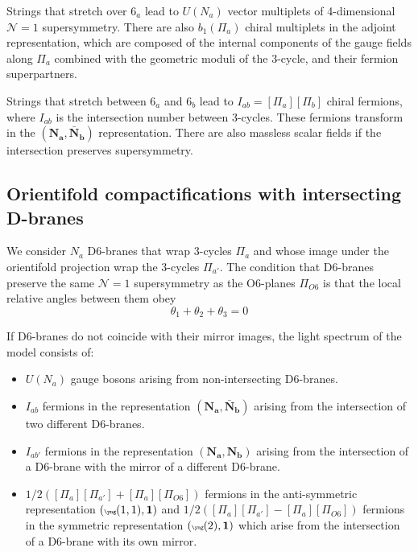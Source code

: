 Strings that stretch over $6_a$ lead to $U(N_a)$ vector multiplets of 4-dimensional $\mathcal N=1$ supersymmetry.
There are also $b_1(\Pi_a)$ chiral multiplets in the adjoint representation,
which are composed of the internal components of the gauge fields along $\Pi_a$ combined with 
the geometric moduli of the $3$-cycle, and their fermion superpartners.

Strings that stretch between $6_a$ and $6_b$ lead to $I_{ab}=[\Pi_a][\Pi_b]$ chiral fermions, where $I_{ab}$ 
is the intersection number between $3$-cycles. These fermions transform in the $(\mathbf{N_a},\mathbf{\bar N_b})$ representation.
There are also massless scalar fields if the intersection preserves supersymmetry.

\subsection{Orientifold compactifications with intersecting D-branes}

We consider $N_a$ D$6$-branes that wrap 3-cycles $\Pi_a$ and whose image under the orientifold
projection wrap the 3-cycles $\Pi_{a'}$.
The condition that D$6$-branes preserve the same $\mathcal N=1$ supersymmetry as the O$6$-planes $\Pi_{O6}$
is that the local relative angles between them obey
\begin{equation}
  \theta_1 + \theta_2 + \theta_3 = 0
\end{equation}

If D$6$-branes do not coincide with their mirror images, the light spectrum of the model consists of:
\begin{itemize}
  \item $U(N_a)$ gauge bosons arising from non-intersecting D$6$-branes.
  \item $I_{ab}$ fermions in the representation $(\mathbf{N_a},\mathbf{\bar N_b})$ arising from the
    intersection of two different D$6$-branes.
  \item $I_{ab'}$ fermions in the representation $(\mathbf{N_a},\mathbf{N_b})$ arising from the intersection of 
    a D$6$-brane with the mirror of a different D$6$-brane.
  \item $1/2([\Pi_a][\Pi_{a'}]+[\Pi_a][\Pi_{O6}])$ fermions in the anti-symmetric representation $({\tiny\yng(1,1)},\mathbf 1)$ and
    $1/2([\Pi_a][\Pi_{a'}]-[\Pi_a][\Pi_{O6}])$ fermions in the symmetric representation $({\tiny\yng(2)},\mathbf 1)$ which
    arise from the intersection of a D$6$-brane with its own mirror.
\end{itemize}

